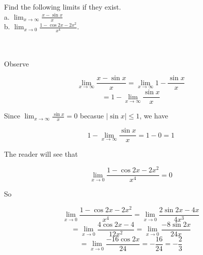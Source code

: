 Find the following limits if they exist.\\

a. $\lim_{x\rightarrow\infty}\frac{x-\sin x}{x}$\\

b. $\lim_{x\rightarrow0}\frac{1-\cos2x-2x^2}{x^4}$.\\\\

\begin{solution}\renewcommand{\qedsymbol}{}\ \\
    Observe
    
    $$\lim_{x\rightarrow\infty}\frac{x-\sin x}{x}=\lim_{x\rightarrow\infty}1-\frac{\sin x}{x}$$
    $$=1-\lim_{x\rightarrow\infty}\frac{\sin x}{x}$$
    
    Since $\lim_{x\rightarrow\infty}\frac{\sin x}{x}=0$ becasue $|\sin x|\leq1$, we have
    
    $$1-\lim_{x\rightarrow\infty}\frac{\sin x}{x}=1-0=1$$

    The reader will see that
    
    $$\lim_{x\rightarrow0}\frac{1-\cos2x-2x^2}{x^4}=0$$
    
    So
    
    $$\lim_{x\rightarrow0}\frac{1-\cos2x-2x^2}{x^4}=\lim_{x\rightarrow0}\frac{2\sin2x-4x}{4x^3}$$
    $$=\lim_{x\rightarrow0}\frac{4\cos2x-4}{12x^2}=\lim_{x\rightarrow0}\frac{-8\sin2x}{24x}$$
    $$=\lim_{x\rightarrow0}\frac{-16\cos2x}{24}=-\frac{16}{24}=-\frac23$$

\end{solution}